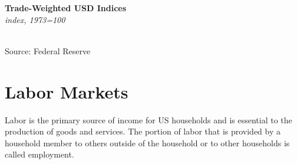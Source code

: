 \documentclass{report}
\makeatletter
\newcommand{\tbllink}[1]{\href{https://raw.githubusercontent.com/bdecon/US-chartbook/master/chartbook/data/#1}{\faTable}}
\newcommand*\short[1]{\expandafter\@gobbletwo\number\numexpr#1\relax}
\newcommand{\stdnode}[3]{\node[below, align=left, shift=({#1,#2})]{#3};}
\newcommand{\dateaxisticks}{
		date coordinates in=x, axis line style={draw=none},
		xmax={2020-02-01},
		max space between ticks=40,	    
		xtick={{1990-01-01}, {1992-01-01}, {1994-01-01}, 
			{1996-01-01}, {1998-01-01}, {2000-01-01}, 
			{2002-01-01}, {2004-01-01}, {2006-01-01},
			{2008-01-01}, {2010-01-01}, {2012-01-01}, {2014-01-01},
		    {2016-01-01}, {2018-01-01}, {2020-01-01}},
		minor xtick={{1989-01-01}, {1991-01-01}, {1993-01-01},
			{1995-01-01}, {1997-01-01}, {1999-01-01}, 
			{2001-01-01}, {2003-01-01}, {2005-01-01}, {2007-01-01},
		    {2009-01-01}, {2011-01-01}, {2013-01-01}, {2015-01-01},
		    {2017-01-01}, {2019-01-01}},
		enlarge y limits={0.06}, enlarge x limits={0.01},
		}
\newcommand{\bbar}[2]{extra #1 ticks = {{#2}}, extra #1 tick labels = ,
		extra #1 tick style = {grid=major, grid style={thick, black!25}},}
\newcommand{\stdline}[4]{\addplot[very thick, no markers, color=#1] 
		table [x=#2, y=#3, col sep=comma] {#4};	}
\newcommand{\rbars}{
		\fill[color=black!10] (axis cs:{1990-07-01},\pgfkeysvalueof{/pgfplots/ymin}) rectangle 
			(axis cs:{1991-03-01}, \pgfkeysvalueof{/pgfplots/ymax});
		\fill[color=black!10] (axis cs:{2007-12-01},\pgfkeysvalueof{/pgfplots/ymin}) rectangle 
			(axis cs:{2009-07-01}, \pgfkeysvalueof{/pgfplots/ymax});
		\fill[color=black!10] (axis cs:{2001-03-01},\pgfkeysvalueof{/pgfplots/ymin}) rectangle 
			(axis cs:{2001-11-01}, \pgfkeysvalueof{/pgfplots/ymax});}
\makeatother
\begin{document}
{{{{\begin{minipage}{0.76\textwidth}
\noindent \normalsize \textbf{Trade-Weighted USD Indices}\\
\footnotesize{\textit{index, 1973=100}}\\
\noindent \hspace*{-2mm} \\
\footnotesize{Source: Federal Reserve} \hfill \tbllink{fx_idx.csv}

\end{minipage}

\newpage
\section*{\color{darkgray}\LARGE \seriffont Labor Markets}
\label{sec:lab}

\begin{minipage}{0.34\textwidth}
\small Labor is the primary source of income for US households and is essential to the production of goods and services. The portion of labor that is provided by a household member to others outside of the household or to other households is called employment. \\


\end{minipage}}}}}
\end{document}
